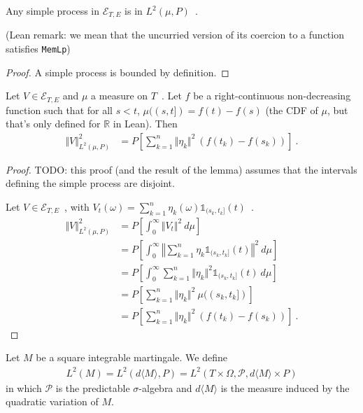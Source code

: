 \begin{lemma}\label{lem:simpleProcess_mem_L2Predictable}
Any simple process in $\mathcal{E}_{T, E}$ is in $L^2(\mu, P)$~.

(Lean remark: we mean that the uncurried version of its coercion to a function satisfies \texttt{MemLp})
\end{lemma}

\begin{proof}
A simple process is bounded by definition.
\end{proof}


\begin{lemma}\label{lem:L2Predictable.sq_norm_simpleProcess}
Let $V \in \mathcal{E}_{T, E}$ and $\mu$ a measure on $T$~.
Let $f$ be a right-continuous non-decreasing function such that for all $s < t$, $\mu((s,t]) = f(t) - f(s)$ (the CDF of $\mu$, but that's only defined for $\mathbb{R}$ in Lean).
Then
\begin{align*}
  \Vert V \Vert^2_{L^2(\mu, P)}
  &= P\left[ \sum_{k=1}^n \Vert \eta_k \Vert^2 \: (f(t_k) - f(s_k)) \right]
  \: .
\end{align*}
\end{lemma}

\begin{proof}
TODO: this proof (and the result of the lemma) assumes that the intervals defining the simple process are disjoint.

Let $V \in \mathcal{E}_{T, E}$~, with $V_t(\omega) = \sum_{k=1}^n \eta_k(\omega) \mathbb{1}_{(s_k, t_k]}(t)$~.
\begin{align*}
  \Vert V \Vert^2_{L^2(\mu, P)}
  &= P\left[ \int_0^{\infty} \Vert V_t \Vert^2 \: d\mu \right]
  \\
  &= P\left[ \int_0^{\infty} \left\Vert \sum_{k=1}^n \eta_k \mathbb{1}_{(s_k, t_k]}(t) \right\Vert^2 \: d\mu \right]
  \\
  &= P\left[ \int_0^{\infty} \sum_{k=1}^n \Vert \eta_k \Vert^2 \mathbb{1}_{(s_k, t_k]}(t) \: d\mu \right]
  \\
  &= P\left[ \sum_{k=1}^n \Vert \eta_k \Vert^2 \: \mu((s_k, t_k]) \right]
  \\
  &= P\left[ \sum_{k=1}^n \Vert \eta_k \Vert^2 \: (f(t_k) - f(s_k)) \right]
  \: .
\end{align*}
\end{proof}


\begin{definition}\label{def:L2M}
Let $M$ be a square integrable martingale. We define
\begin{align*}
  L^2(M)
  = L^2(d\langle M \rangle, P)
  = L^2(T \times \Omega, \mathcal{P}, d\langle M \rangle \times P)
\end{align*}
in which $\mathcal{P}$ is the predictable $\sigma$-algebra and $d\langle M \rangle$ is the measure induced by the quadratic variation of $M$.
\end{definition}


